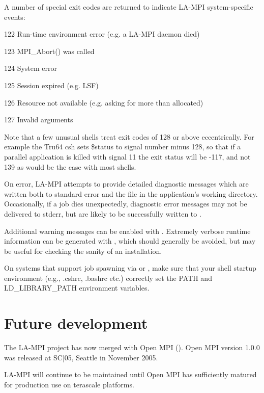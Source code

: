 \documentclass[english]{article}
\begin{document}
A number of special exit codes are returned to indicate LA-MPI
system-specific events:

\begin{Description}\setlength{\itemsep}{0cm}
\item[122] Run-time environment error (e.g. a LA-MPI daemon died)
\item[123] MPI\_Abort() was called
\item[124] System error
\item[125] Session expired (e.g. LSF)
\item[126] Resource not available (e.g. asking for more than allocated)
\item[127] Invalid arguments
\end{Description}

Note that a few unusual shells treat exit codes of 128 or above
eccentrically.  For example the Tru64 csh sets \$status to signal
number minus 128, so that if a parallel application is killed with
signal 11 the exit status will be -117, and not 139 as would be the
case with most shells.

On error, LA-MPI attempts to provide detailed diagnostic messages
which are written both to standard error and the file 
in the application's working directory.  Occasionally, if a job dies
unexpectedly, diagnostic error messages may not be delivered to
stderr, but are likely to be successfully written to .

Additional warning messages can be enabled with .
Extremely verbose runtime information can be generated with
, which should generally be avoided, but may be
useful for checking the sanity of an installation.

On systems that support job spawning via  or ,
make sure that your shell startup environment (e.g., .cshrc, .bashrc
etc.) correctly set the PATH and LD\_LIBRARY\_PATH environment
variables.

\section{Future development}
The LA-MPI project has now merged with Open MPI
().  Open MPI version 1.0.0 was released
at SC|05, Seattle in November 2005.

LA-MPI will continue to be maintained until Open MPI has sufficiently
matured for production use on terascale platforms.
\end{document}
